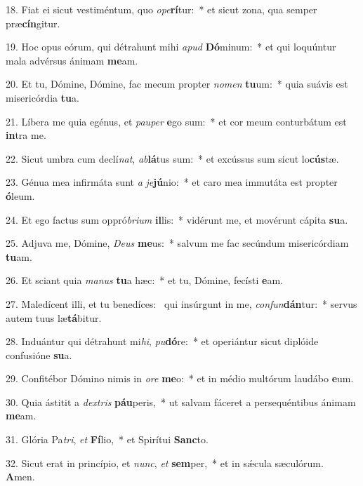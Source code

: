 18. Fiat ei sicut vestiméntum, quo \textit{o}\textit{pe}\textbf{rí}tur:~*  et sicut zona, qua semper præ\textbf{cín}gitur.\

19. Hoc opus eórum, qui détrahunt mihi \textit{a}\textit{pud} \textbf{Dó}minum:~*  et qui loquúntur mala advérsus ánimam \textbf{me}am.\

20. Et tu, Dómine, Dómine, fac mecum propter \textit{no}\textit{men} \textbf{tu}um:~*  quia suávis est misericórdia \textbf{tu}a.\

21. Líbera me quia egénus, et \textit{pau}\textit{per} \textbf{e}go sum:~*  et cor meum conturbátum est \textbf{in}tra me.\

22. Sicut umbra cum declí\textit{nat}, \textit{ab}\textbf{lá}tus sum:~*  et excússus sum sicut lo\textbf{cús}tæ.\

23. Génua mea infirmáta sunt \textit{a} \textit{je}\textbf{jú}nio:~*  et caro mea immutáta est propter \textbf{ó}leum.\

24. Et ego factus sum oppró\textit{bri}\textit{um} \textbf{il}lis:~*  vidérunt me, et movérunt cápita \textbf{su}a.\

25. Adjuva me, Dómine, \textit{De}\textit{us} \textbf{me}us:~*  salvum me fac secúndum misericórdiam \textbf{tu}am.\

26. Et sciant quia \textit{ma}\textit{nus} \textbf{tu}a hæc:~*  et tu, Dómine, fecísti \textbf{e}am.\

27. Maledícent illi, et tu benedíces: \dag\  qui insúrgunt in me, \textit{con}\textit{fun}\textbf{dán}tur:~*  servus autem tuus læ\textbf{tá}bitur.\

28. Induántur qui détrahunt mi\textit{hi}, \textit{pu}\textbf{dó}re:~*  et operiántur sicut diplóide confusióne \textbf{su}a.\

29. Confitébor Dómino nimis in \textit{o}\textit{re} \textbf{me}o:~*  et in médio multórum laudábo \textbf{e}um.\

30. Quia ástitit a \textit{dex}\textit{tris} \textbf{páu}peris,~*  ut salvam fáceret a persequéntibus ánimam \textbf{me}am.\

31. Glória Pa\textit{tri}, \textit{et} \textbf{Fí}lio,~*  et Spirítui \textbf{Sanc}to.\

32. Sicut erat in princípio, et \textit{nunc}, \textit{et} \textbf{sem}per,~*  et in sǽcula sæculórum. \textbf{A}men.\

